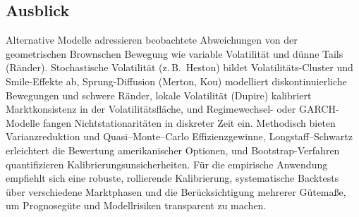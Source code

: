 \subsection{Ausblick}

Alternative Modelle adressieren beobachtete Abweichungen von der geometrischen Brownschen Bewegung wie variable Volatilität
und dünne Tails (Ränder). Stochastische Volatilität (z.\,B.\ Heston) bildet Volatilitäts-Cluster und 
Smile-Effekte ab, Sprung-Diffusion (Merton, Kou) modelliert diskontinuierliche Bewegungen und 
schwere Ränder, lokale Volatilität (Dupire) kalibriert Marktkonsistenz in der Volatilitätsfläche,
und Regimewechsel- oder GARCH-Modelle fangen Nichtstationaritäten in diskreter Zeit ein. 
Methodisch bieten Varianzreduktion und Quasi–Monte–Carlo Effizienzgewinne, Longstaff–Schwartz 
erleichtert die Bewertung amerikanischer Optionen, und Bootstrap-Verfahren 
quantifizieren Kalibrierungsunsicherheiten. Für die empirische Anwendung empfiehlt sich eine 
robuste, rollierende Kalibrierung, systematische Backtests über verschiedene Marktphasen und die 
Berücksichtigung mehrerer Gütemaße, um Prognosegüte und Modellrisiken transparent zu machen.